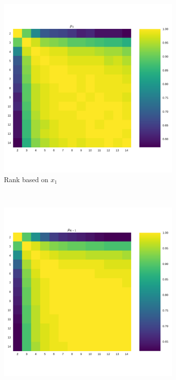 \documentclass[10pt,journal]{IEEEtran}
\begin{document}
\begin{figure}[!htbp]
    \centering
    \begin{subfigure}[t]{.3\columnwidth}
        \centering
        \includegraphics[width=.9\columnwidth]{img/correlation_heatmap_invade.pdf}
        \caption{Rank based on \(x_1\)}
    \end{subfigure}
    ~
    \begin{subfigure}[t]{.3\columnwidth}
        \centering
        \includegraphics[width=.9\columnwidth]{img/correlation_heatmap_resist.pdf}

\end{subfigure}
\end{figure}
\end{document}
